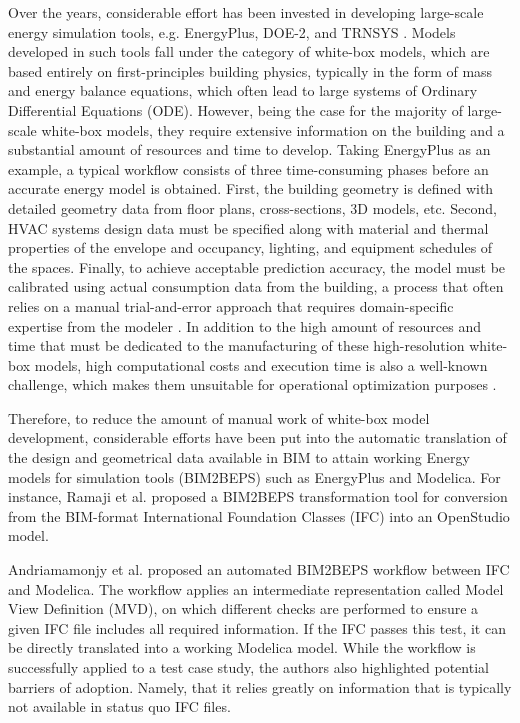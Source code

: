 Over the years, considerable effort has been invested in developing large-scale energy simulation tools, e.g. EnergyPlus, DOE-2, and TRNSYS \cite{crawley2001a, winkelmann-a, klein2007a}. Models developed in such tools fall under the category of white-box models, which are based entirely on first-principles building physics, typically in the form of mass and energy balance equations, which often lead to large systems of Ordinary Differential Equations (ODE). However, being the case for the majority of large-scale white-box models, they require extensive information on the building and a substantial amount of resources and time to develop. Taking EnergyPlus as an example, a typical workflow consists of three time-consuming phases before an accurate energy model is obtained. First, the building geometry is defined with detailed geometry data from floor plans, cross-sections, 3D models, etc. Second, HVAC systems design data must be specified along with material and thermal properties of the envelope and occupancy, lighting, and equipment schedules of the spaces. Finally, to achieve acceptable prediction accuracy, the model must be calibrated using actual consumption data from the building, a process that often relies on a manual trial-and-error approach that requires domain-specific expertise from the modeler \cite{reddy2006a}. In addition to the high amount of resources and time that must be dedicated to the manufacturing of these high-resolution white-box models, high computational costs and execution time is also a well-known challenge, which makes them unsuitable for operational optimization purposes \cite{reynolds2018a, chen2022a}. 

Therefore, to reduce the amount of manual work of white-box model development, considerable efforts have been put into the automatic translation of the design and geometrical data available in BIM to attain working Energy models for simulation tools (BIM2BEPS) such as EnergyPlus and Modelica. For instance, Ramaji et al. \cite{Ramaji2020} proposed a BIM2BEPS transformation tool for conversion from the BIM-format International Foundation Classes (IFC) into an OpenStudio model.

Andriamamonjy et al. \cite{ANDRIAMAMONJY2018166} proposed an automated BIM2BEPS workflow between IFC and Modelica. The workflow applies an intermediate representation called Model View Definition (MVD), on which different checks are performed to ensure a given IFC file includes all required information. If the IFC passes this test, it can be directly translated into a working Modelica model. While the workflow is successfully applied to a test case study, the authors also highlighted potential barriers of adoption. Namely, that it relies greatly on information that is typically not available in status quo IFC files. 

